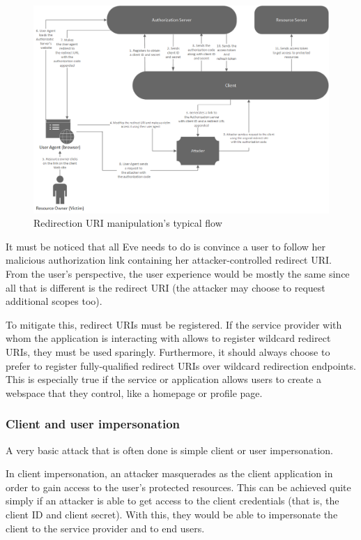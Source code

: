 \begin{figure}[h!]
    \centering
    \includegraphics[scale=0.65]{chapters/images/chp4/authCodeURIAttack.png}
    \caption{Redirection URI manipulation's typical flow}
    \label{fig:reduri}
\end{figure}

It must be noticed that all Eve needs to do is convince a user to follow her malicious authorization link containing her attacker-controlled redirect URI. From the user's perspective, the user experience would be mostly the same since all that is different is the redirect URI (the attacker may choose to request additional scopes too).

To mitigate this, redirect URIs must be registered. If the service provider with whom the application is interacting with allows to register wildcard redirect URIs, they must be used sparingly. Furthermore, it should always choose to prefer to register fully-qualified redirect URIs over wildcard redirection endpoints. This is especially true if the service or application allows users to create a webspace that they control, like a homepage or profile page.

\subsubsection{Client and user impersonation}
A very basic attack that is often done is simple client or user impersonation.

In client impersonation, an attacker masquerades as the client application in order to gain access to the user's protected resources. This can be achieved quite simply if an attacker is able to get access to the client credentials (that is, the client ID and client secret). With this, they would be able to impersonate the client to the service provider and to end users.


